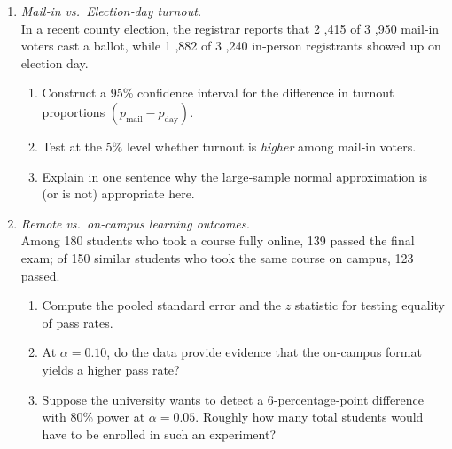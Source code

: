 \documentclass[11pt]{article}
\begin{document}
\begin{enumerate}[label=\textbf{Q\,\arabic*:}, start=11, left=0pt]

\item  \emph{Mail‑in vs.\ Election‑day turnout.} \\
      In a recent county election, the registrar reports that 2 ,415 of 3 ,950 mail‑in voters cast a ballot, while
      1 ,882 of 3 ,240 in‑person registrants showed up on election day.
      \begin{enumerate}[label=(\alph*)]
          \item Construct a 95\% confidence interval for the difference in turnout proportions $(p_{\text{mail}}-p_{\text{day}})$.
          \item Test at the 5\% level whether turnout is \emph{higher} among mail‑in voters.
          \item Explain in one sentence why the large‑sample normal approximation is (or is not) appropriate here.
      \end{enumerate}

\item  \emph{Remote vs.\ on‑campus learning outcomes.} \\
      Among 180 students who took a course fully online, 139 passed the final exam;
      of 150 similar students who took the same course on campus, 123 passed.
      \begin{enumerate}[label=(\alph*)]
          \item Compute the pooled standard error and the $z$ statistic for testing equality of pass rates.
          \item At $\alpha=0.10$, do the data provide evidence that the on‑campus format yields a higher pass rate?
          \item Suppose the university wants to detect a 6‑percentage‑point difference with 80\% power at $\alpha=0.05$.  Roughly how many total students would have to be enrolled in such an experiment?
      \end{enumerate}


\end{enumerate}
\end{document}
